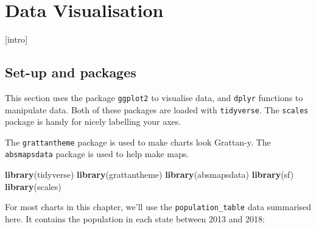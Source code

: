 \documentclass[]{book}
\newenvironment{Shaded}{\begin{snugshade}}{\end{snugshade}}
\newcommand{\CommentTok}[1]{\textcolor[rgb]{0.56,0.35,0.01}{\textit{#1}}}
\newcommand{\DataTypeTok}[1]{\textcolor[rgb]{0.13,0.29,0.53}{#1}}
\newcommand{\KeywordTok}[1]{\textcolor[rgb]{0.13,0.29,0.53}{\textbf{#1}}}
\newcommand{\NormalTok}[1]{#1}
\newcommand{\OperatorTok}[1]{\textcolor[rgb]{0.81,0.36,0.00}{\textbf{#1}}}
\newcommand{\StringTok}[1]{\textcolor[rgb]{0.31,0.60,0.02}{#1}}
\begin{document}
\hypertarget{data-visualisation}{%
\chapter{Data Visualisation}\label{data-visualisation}}

{[}intro{]}

\hypertarget{set-up-and-packages}{%
\section{Set-up and packages}\label{set-up-and-packages}}

This section uses the package \texttt{ggplot2} to visualise data, and \texttt{dplyr} functions to manipulate data. Both of these packages are loaded with \texttt{tidyverse}. The \texttt{scales} package is handy for nicely labelling your axes.

The \texttt{grattantheme} package is used to make charts look Grattan-y. The \texttt{absmapsdata} package is used to help make maps.

\begin{Shaded}
\begin{Highlighting}[]
\KeywordTok{library}\NormalTok{(tidyverse)}
\KeywordTok{library}\NormalTok{(grattantheme)}
\KeywordTok{library}\NormalTok{(absmapsdata)}
\KeywordTok{library}\NormalTok{(sf)}
\KeywordTok{library}\NormalTok{(scales)}
\end{Highlighting}
\end{Shaded}

For most charts in this chapter, we'll use the \texttt{population\_table} data summarised here. It contains the population in each state between 2013 and 2018:

\begin{Shaded}
\end{Shaded}
\end{document}

